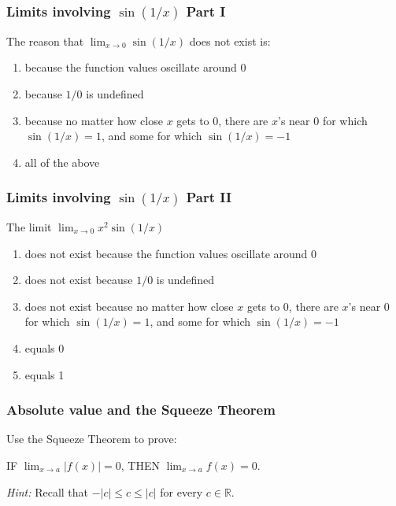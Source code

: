\documentclass[14pt]{beamer}
\begin{document}
\begin{frame}
	\frametitle{Limits involving $\displaystyle \sin(1/x)$ Part I}

	\begin{block}{ The reason that $\displaystyle{\lim_{x\rightarrow 0}\sin (1/x)}$
	does not exist is:}
		\begin{enumerate}
			\item because the function values oscillate around $0$

			\item because $1/0$ is undefined

			\item because no matter how close $x$ gets to $0$, there are $x$'s near
				$0$ for which $\sin(1/x) =1$, and some for which $\sin (1/x)=-1$

			\item all of the above
		\end{enumerate}
	\end{block}
\end{frame}

\begin{frame}
	\frametitle{Limits involving $\displaystyle \sin(1/x)$ Part II}

	\begin{block}{The limit $\displaystyle{\lim_{x\rightarrow 0}x^2\sin (1/x)}$ }
		\begin{enumerate}
			\item does not exist because the function values oscillate around $0$

			\item does not exist because $1/0$ is undefined

			\item does not exist because no matter how close $x$ gets to $0$, there
				are $x$'s near $0$ for which $\sin(1/x) =1$, and some for which $\sin (1/
				x)=-1$

			\item equals 0

			\item equals 1
		\end{enumerate}
	\end{block}
\end{frame}

\begin{frame}
	\frametitle{Absolute value and the Squeeze Theorem}

	Use the Squeeze Theorem to prove:
	\begin{theorem}
		IF $\displaystyle \lim_{x\to a}|f(x)| = 0$, THEN
		$\displaystyle \lim_{x\to a}f(x)=0$.\\
	\end{theorem}

	\emph{Hint:} Recall that $-|c| \leq c \leq |c|$ for every $c \in \mathbb{R}$.
\end{frame}
\end{document}
